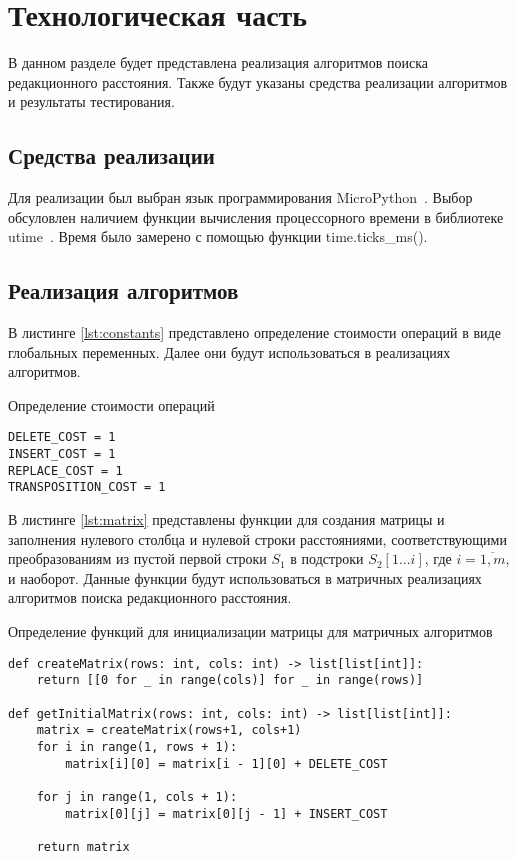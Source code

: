 \section{Технологическая часть}

В данном разделе будет представлена реализация алгоритмов поиска редакционного расстояния. Также будут указаны средства реализации алгоритмов и результаты тестирования.

\subsection{Средства реализации}

Для реализации был выбран язык программирования MicroPython~\cite{python}. Выбор обсуловлен наличием функции вычисления процессорного времени в библиотеке utime~\cite{time}. Время было замерено с помощью функции time.ticks\_ms().

\subsection{Реализация алгоритмов}

В листинге \ref{lst:constants} представлено определение стоимости операций в виде глобальных переменных. Далее они будут использоваться в реализациях алгоритмов.
 
\begin{listing}[H]
\caption{Определение стоимости операций}
\label{lst:constants}
\begin{verbatim}
DELETE_COST = 1
INSERT_COST = 1
REPLACE_COST = 1
TRANSPOSITION_COST = 1
\end{verbatim}
\end{listing}

В листинге \ref{lst:matrix} представлены функции для создания матрицы и заполнения нулевого столбца и нулевой строки расстояниями, соответствующими преобразованиям из пустой первой строки \(S_1\) в подстроки \(S_2[1...i]\), где \(i = \overline{1,m}\), и наоборот. Данные функции будут использоваться в матричных реализациях алгоритмов поиска редакционного расстояния.
 
\begin{listing}
\caption{Определение функций для инициализации матрицы для матричных алгоритмов}
\label{lst:matrix}
\begin{verbatim}
def createMatrix(rows: int, cols: int) -> list[list[int]]:
    return [[0 for _ in range(cols)] for _ in range(rows)]

def getInitialMatrix(rows: int, cols: int) -> list[list[int]]:
    matrix = createMatrix(rows+1, cols+1)
    for i in range(1, rows + 1):
        matrix[i][0] = matrix[i - 1][0] + DELETE_COST

    for j in range(1, cols + 1):
        matrix[0][j] = matrix[0][j - 1] + INSERT_COST

    return matrix
\end{verbatim}
\end{listing}

